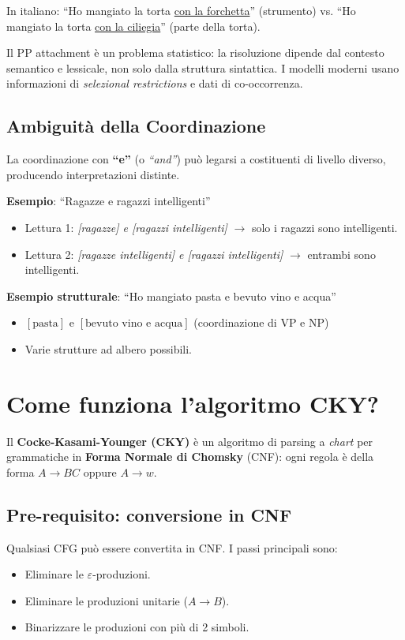 \documentclass[12pt,a4paper]{article}
\begin{document}
In italiano: ``Ho mangiato la torta \underline{con la forchetta}'' (strumento) vs. ``Ho mangiato la torta \underline{con la ciliegia}'' (parte della torta).

Il PP attachment è un problema statistico: la risoluzione dipende dal contesto semantico e lessicale, non solo dalla struttura sintattica. I modelli moderni usano informazioni di \emph{selezional restrictions} e dati di co-occorrenza.

\subsection{Ambiguità della Coordinazione}

La coordinazione con \textbf{``e''} (o \emph{``and''}) può legarsi a costituenti di livello diverso, producendo interpretazioni distinte.

\textbf{Esempio}: ``Ragazze e ragazzi intelligenti''
\begin{itemize}[leftmargin=1.5em]
  \item Lettura 1: \emph{[ragazze] e [ragazzi intelligenti]} $\to$ solo i ragazzi sono intelligenti.
  \item Lettura 2: \emph{[ragazze intelligenti] e [ragazzi intelligenti]} $\to$ entrambi sono intelligenti.
\end{itemize}

\textbf{Esempio strutturale}: ``Ho mangiato pasta e bevuto vino e acqua''
\begin{itemize}[leftmargin=1.5em]
  \item $[\text{pasta}]$ e $[\text{bevuto vino e acqua}]$ (coordinazione di VP e NP)
  \item Varie strutture ad albero possibili.
\end{itemize}

\section{Come funziona l'algoritmo CKY?}

Il \textbf{Cocke-Kasami-Younger (CKY)} è un algoritmo di parsing a \emph{chart} per grammatiche in \textbf{Forma Normale di Chomsky} (CNF): ogni regola è della forma $A \to BC$ oppure $A \to w$.

\subsection{Pre-requisito: conversione in CNF}
Qualsiasi CFG può essere convertita in CNF. I passi principali sono:
\begin{itemize}[leftmargin=1.5em]
  \item Eliminare le $\varepsilon$-produzioni.
  \item Eliminare le produzioni unitarie ($A \to B$).
  \item Binarizzare le produzioni con più di 2 simboli.
\end{itemize}
\end{document}
